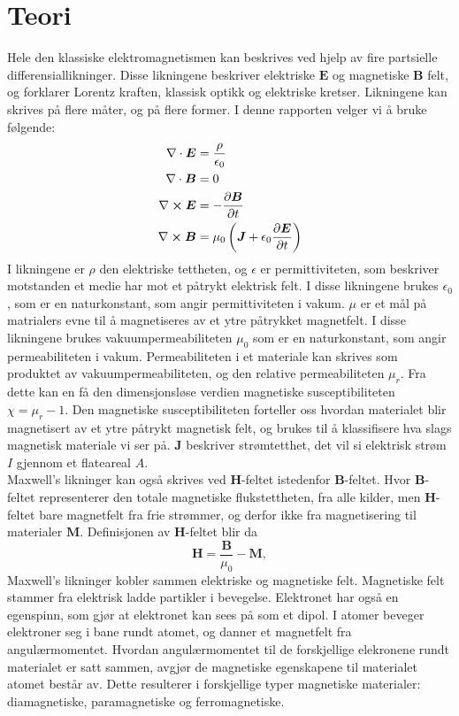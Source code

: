 \documentclass[%
 reprint,
 amsmath,amssymb,
 aps,
 norsk,
]{revtex4-1}
\begin{document}
\section{\label{sec:level2}Teori}
Hele den klassiske elektromagnetismen kan beskrives ved hjelp av fire partsielle differensiallikninger. Disse likningene beskriver elektriske $\bm{E}$ og magnetiske $\bm{B}$ felt, og forklarer Lorentz kraften, klassisk optikk og elektriske kretser. Likningene kan skrives på flere måter, og på flere former. I denne rapporten velger vi å bruke følgende:
\begin{align}
  \nabla \cdot \bm{E} &= \frac{\rho}{\epsilon_0} \label{1}\\
  \nabla \cdot \bm{B} &= 0 \label{2}\\
  \nabla \cross \bm{E} &= -\pdv{\bm{B}}{t} \label{3}\\
  \nabla \cross \bm{B} &= \mu_0\left(\bm{J} + \epsilon_0\pdv{\bm{E}}{t}\right) \label{4}
\end{align}
I likningene er $\rho$ den elektriske tettheten, og $\epsilon$ er permittiviteten, som beskriver motstanden et medie har mot et påtrykt elektrisk felt. I disse likningene brukes $\epsilon_0$, som er en naturkonstant, som angir permittiviteten i vakum. $\mu$ er et mål på matrialers evne til å magnetiseres av et ytre påtrykket magnetfelt. I disse likningene brukes vakuumpermeabiliteten $\mu_0$ som er en naturkonstant, som angir permeabiliteten i vakum. Permeabiliteten i et materiale kan skrives som produktet av vakuumpermeabiliteten, og den relative permeabiliteten $\mu_r$. Fra dette kan en få den dimensjonsløse verdien magnetiske susceptibiliteten $\chi = \mu_r - 1$. Den magnetiske susceptibiliteten forteller oss hvordan materialet blir magnetisert av et ytre påtrykt magnetisk felt, og brukes til å klassifisere hva slags magnetisk materiale vi ser på. $\bm{J}$ beskriver strømtetthet, det vil si elektrisk strøm $I$ gjennom et flateareal $A$. \\
Maxwell's likninger kan også skrives ved $\bm{H}$-feltet istedenfor $\bm{B}$-feltet. Hvor $\bm{B}$-feltet representerer den totale magnetiske flukstettheten, fra alle kilder, men $\bm{H}$-feltet bare magnetfelt fra frie strømmer, og derfor ikke fra magnetisering til materialer $\bm{M}$. Definisjonen av $\bm{H}$-feltet blir da
\begin{equation}
  \bm{H} = \frac{\bm{B}}{\mu_0}-\bm{M}, \label{get_H}
\end{equation}
Maxwell's likninger kobler sammen elektriske og magnetiske felt. Magnetiske felt stammer fra elektrisk ladde partikler i bevegelse. Elektronet har også en egenspinn, som gjør at elektronet kan sees på som et dipol. I atomer beveger elektroner seg i bane rundt atomet, og danner et magnetfelt fra angulærmomentet. Hvordan angulærmomentet til de forskjellige elekronene rundt materialet er satt sammen, avgjør de magnetiske egenskapene til materialet atomet består av. Dette resulterer i forskjellige typer magnetiske materialer: diamagnetiske, paramagnetiske og ferromagnetiske.
\end{document}
